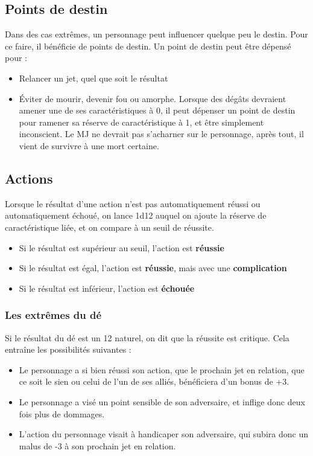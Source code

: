 \subsection{Points de destin}

Dans des cas extrêmes, un personnage peut influencer quelque peu le destin. Pour ce faire, il bénéficie de points de destin. Un point de destin peut être dépensé pour :

\begin{itemize}
	\item Relancer un jet, quel que soit le résultat
	\item Éviter de mourir, devenir fou ou amorphe. Lorsque des dégâts devraient amener une de ses caractéristiques à 0, il peut dépenser un point de destin pour ramener sa réserve de caractéristique à 1, et être simplement inconscient. Le MJ ne devrait pas s'acharner sur le personnage, après tout, il vient de survivre à une mort certaine.
\end{itemize}

\subsection{Actions}

Lorsque le résultat d'une action n'est pas automatiquement réussi ou automatiquement échoué, on lance 1d12 auquel on ajoute la réserve de caractéristique liée, et on compare à un seuil de réussite. 

\begin{itemize}
	\item Si le résultat est supérieur au seuil, l'action est \textbf{réussie}
	\item Si le résultat est égal, l'action est \textbf{réussie}, mais avec une \textbf{complication}
	\item Si le résultat est inférieur, l'action est \textbf{échouée}
\end{itemize}

\subsubsection*{Les extrêmes du dé}

Si le résultat du dé est un 12 naturel, on dit que la réussite est critique. Cela entraîne les possibilités suivantes :

\begin{itemize}
	\item Le personnage a si bien réussi son action, que le prochain jet en relation, que ce soit le sien ou celui de l'un de ses alliés, bénéficiera d'un bonus de +3.
	\item Le personnage a visé un point sensible de son adversaire, et inflige donc deux fois plus de dommages.
	\item L'action du personnage visait à handicaper son adversaire, qui subira donc un malus de -3 à son prochain jet en relation.
\end{itemize}


